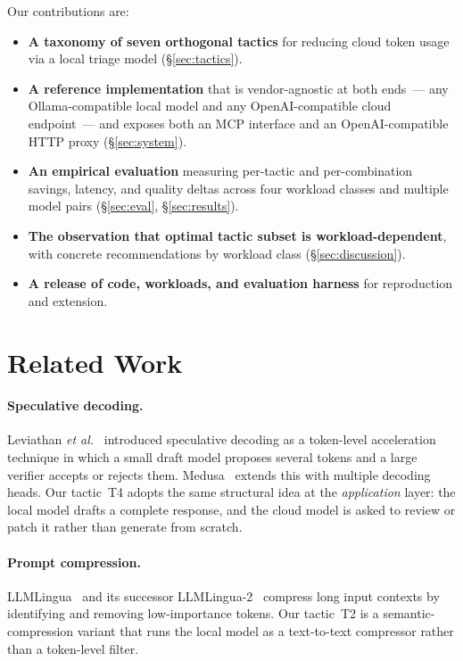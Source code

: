 \documentclass[11pt,a4paper]{article}
\begin{document}
Our contributions are:

\begin{itemize}
  \item \textbf{A taxonomy of seven orthogonal tactics} for reducing
    cloud token usage via a local triage model
    (\S\ref{sec:tactics}).
  \item \textbf{A reference implementation} that is vendor-agnostic
    at both ends~--- any Ollama-compatible local model and any
    OpenAI-compatible cloud endpoint~--- and exposes both an MCP
    interface and an OpenAI-compatible HTTP proxy
    (\S\ref{sec:system}).
  \item \textbf{An empirical evaluation} measuring per-tactic and
    per-combination savings, latency, and quality deltas across
    four workload classes and multiple model pairs
    (\S\ref{sec:eval}, \S\ref{sec:results}).
  \item \textbf{The observation that optimal tactic subset is
    workload-dependent}, with concrete recommendations by workload
    class (\S\ref{sec:discussion}).
  \item \textbf{A release of code, workloads, and evaluation
    harness} for reproduction and extension.
\end{itemize}

\section{Related Work}
\label{sec:related}

\paragraph{Speculative decoding.}
Leviathan \emph{et al.}~\cite{leviathan2023} introduced
speculative decoding as a token-level acceleration technique in which
a small draft model proposes several tokens and a large verifier
accepts or rejects them. Medusa~\cite{medusa} extends this with
multiple decoding heads. Our tactic~T4 adopts the same structural
idea at the \emph{application} layer: the local model drafts a
complete response, and the cloud model is asked to review or patch
it rather than generate from scratch.

\paragraph{Prompt compression.}
LLMLingua~\cite{llmlingua} and its successor
LLMLingua-2~\cite{llmlingua2} compress long input contexts by
identifying and removing low-importance tokens. Our tactic~T2 is a
semantic-compression variant that runs the local model as a
text-to-text compressor rather than a token-level filter.
\end{document}
